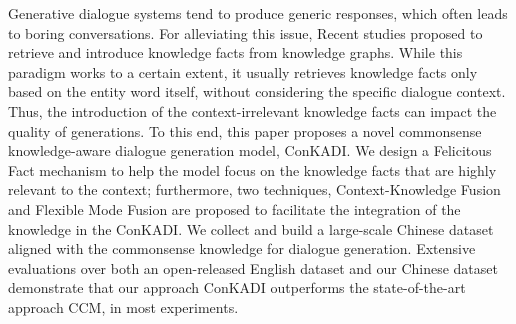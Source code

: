 Generative dialogue systems tend to produce generic responses, which often leads to boring conversations. For alleviating this issue,  Recent studies proposed to retrieve and introduce knowledge facts from knowledge graphs. While this paradigm works to a certain extent, it usually retrieves knowledge facts only based on the entity word itself, without considering the specific dialogue context.  Thus, the introduction of the context-irrelevant knowledge facts can impact the quality of generations.  To this end, this paper proposes a novel commonsense knowledge-aware dialogue generation model, ConKADI. We design a Felicitous Fact mechanism to help the model focus on the knowledge facts that are highly relevant to the context; furthermore, two techniques, Context-Knowledge Fusion and Flexible Mode Fusion are proposed to facilitate the integration of the knowledge in the ConKADI.  We collect and build a  large-scale Chinese dataset aligned with the commonsense knowledge for dialogue generation. Extensive evaluations over both an open-released English dataset and our Chinese dataset demonstrate that our approach ConKADI outperforms the state-of-the-art approach CCM, in most experiments.
